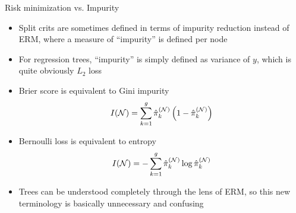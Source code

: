 \documentclass[11pt,compress,t,notes=noshow, xcolor=table]{beamer}
\begin{document}
\begin{vbframe}{Risk minimization vs. Impurity}

\begin{itemize}
\item Split crits are sometimes defined in terms of impurity reduction instead of ERM, where a measure of ``impurity'' is defined per node
\item For regression trees, \enquote{impurity} is simply defined as variance of $y$, which is quite obviously $L_2$ loss

\item Brier score is equivalent to Gini impurity
$$I(\mathcal{N}) = \sum\limits_{k=1}^g \hat\pi_k^{(\mathcal{N})} \left( 1-\hat\pi_k^{(\mathcal{N})} \right)$$
\item Bernoulli loss is equivalent to entropy
$$I(\mathcal{N}) = -\sum\limits_{k=1}^g \hat\pi_k^{(\mathcal{N})} \log \hat\pi_k^{(\mathcal{N})}$$
\item Trees can be understood completely through the lens of ERM, so this new terminology is basically unnecessary and confusing
\end{itemize}
\end{vbframe}
\end{document}
